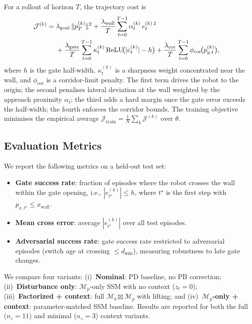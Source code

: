 \documentclass[journal,twoside,web]{ieeecolor}
\begin{document}
For a rollout of horizon \(T\), the trajectory cost is
\begin{align}
\mathcal{J}^{(k)}
=\;&
\lambda_{\mathrm{goal}}\,\|p_T^{(k)}\|^2
+
\frac{\lambda_{\mathrm{wall}}}{T}\sum_{t=0}^{T-1}
  \alpha_t^{(k)}\,e_t^{(k)\,2}
\notag\\
&+
\frac{\lambda_{\mathrm{gate}}}{T}\sum_{t=0}^{T-1}
  \kappa_t^{(k)}\,
  \mathrm{ReLU}\!\bigl(|e_t^{(k)}|-h\bigr)
+
\frac{\lambda_{\mathrm{cor}}}{T}\sum_{t=0}^{T-1}
  \phi_{\mathrm{cor}}\!\bigl(p_{y,t}^{(k)}\bigr),
\label{eq:gate-loss}
\end{align}
where \(h\) is the gate half-width, \(\kappa_t^{(k)}\) is a sharpness weight concentrated
near the wall, and \(\phi_{\mathrm{cor}}\) is a corridor-limit penalty. The first term
drives the robot to the origin; the second penalises lateral deviation at the wall weighted
by the approach proximity \(\alpha_t\); the third adds a hard margin once the gate error
exceeds the half-width; the fourth enforces the corridor bounds.
The training objective minimises the empirical average \(\mathcal{J}_{\mathrm{train}}=\frac{1}{N}\sum_k\mathcal{J}^{(k)}\) over \(\theta\).

\subsection{Evaluation Metrics}
\label{subsec:gate-metrics}

We report the following metrics on a held-out test set:
\begin{itemize}
\item \textbf{Gate success rate}: fraction of episodes where the robot crosses the wall within
  the gate opening, i.e., \(|e_{t^\star}^{(k)}|\le h\), where \(t^\star\) is the first step
  with \(p_{x,t^\star}\le x_{\mathrm{wall}}\).
\item \textbf{Mean cross error}: average \(|e_{t^\star}^{(k)}|\) over all test episodes.
\item \textbf{Adversarial success rate}: gate success rate restricted to adversarial episodes
  (switch age at crossing \(\le d_{\min}\)), measuring robustness to late gate changes.
\end{itemize}

We compare four variants: (i)~\textbf{Nominal}: PD baseline, no PB correction;
(ii)~\textbf{Disturbance only}: \(\mathcal{M}_p\)-only SSM with no context (\(z_t=0\));
(iii)~\textbf{Factorized + context}: full \(\mathcal{M}_b\boxtimes\mathcal{M}_p\) with
lifting; and (iv)~\textbf{\(\mathcal{M}_p\)-only + context}: parameter-matched SSM baseline.
Results are reported for both the full (\(n_z=11\)) and minimal (\(n_z=3\)) context variants.
\end{document}
